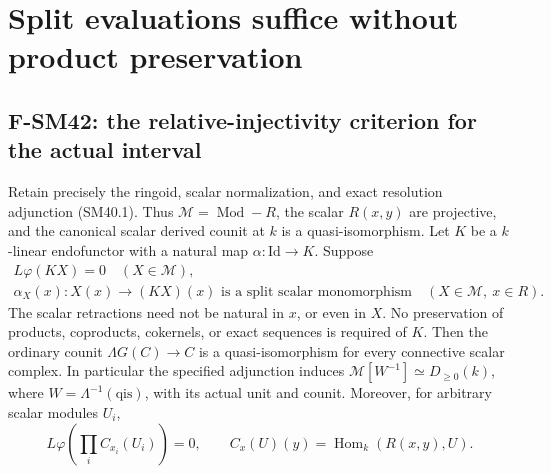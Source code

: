 \section{Split evaluations suffice without product preservation}

\subsection{F-SM42: the relative-injectivity criterion for the actual interval}

Retain precisely the ringoid, scalar normalization, and exact
resolution adjunction (SM40.1).  Thus
\(\mathcal M=\operatorname{Mod}\!-\!R\), the scalar
\(R(x,y)\) are projective, and the canonical scalar
derived counit at \(k\) is a quasi-isomorphism.
Let \(K\) be a \(k\)-linear endofunctor with a natural
map \(\alpha:\mathrm{Id}\to K\).  Suppose
\[
 \begin{gathered}
       L\varphi(KX)=0\quad(X\in\mathcal M),\\
       \alpha_X(x):X(x)\longrightarrow(KX)(x)
          \text{ is a split scalar monomorphism}
                    \quad(X\in\mathcal M,\ x\in R).
 \end{gathered}                                                \tag{SM42.1}
\]
The scalar retractions need not be natural in \(x\), or
even in \(X\).  No preservation of products, coproducts,
cokernels, or exact sequences is required of \(K\).
Then the ordinary counit \(\Lambda G(C)\to C\) is a
quasi-isomorphism for every connective scalar complex.
In particular the specified adjunction induces
\(\mathcal M[W^{-1}]\simeq D_{\ge0}(k)\), where
\(W=\Lambda^{-1}(\mathrm{qis})\), with its actual unit and counit.
Moreover, for arbitrary scalar modules \(U_i\),
\[
                  L\varphi\!\left(\prod_i C_{x_i}(U_i)\right)=0,
 \qquad C_x(U)(y)=\operatorname{Hom}_k(R(x,y),U).              \tag{SM42.2}
\]

